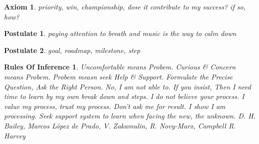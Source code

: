 \documentclass{article}
\newtheorem{axiom}{Axiom}
\newtheorem{postulate}{Postulate}
\newtheorem{rules of inference}{Rules Of Inference}
\begin{document}
\begin{axiom}
    priority,
    win, championship,
    dose it contribute to my success? if so, how?
\end{axiom}

\begin{postulate}
    paying attention to breath and music is the way to calm down
\end{postulate}

\begin{postulate}
    goal,
    roadmap,
    milestone,
    step
\end{postulate}

\begin{rules of inference}
    Uncomfortable means Probem.
    Curious & Concern means Probem.
    Probem measn seek Help & Support.
    Formulate the Precise Question, Ask the Right Person.
    No, I am not able to. If you insist,
    Then I need time to learn by my own break down and steps.
    I do not believe your process.
    I value my process, trust my process.
    Don't ask me for result. I show I am  processing.
    Seek support system to learn when facing the new, the unknown.
    D. H. Bailey, Marcos López de Prado, V. Zakamulin, R. Novy-Marx, Campbell R. Harvey
\end{rules of inference}
\end{document}
